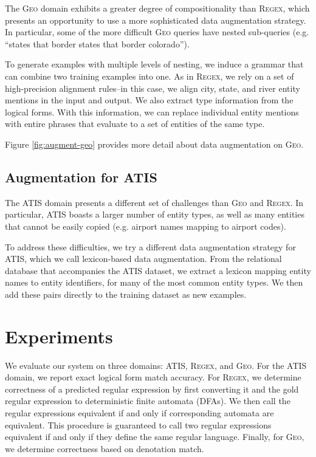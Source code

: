 \documentclass[11pt,letterpaper]{article}
\newcommand{\atis}{\textsc{ATIS}\xspace}
\newcommand{\regex}{\textsc{Regex}\xspace}
\newcommand{\geo}{\textsc{Geo}\xspace}
\begin{document}
The \geo domain exhibits a greater degree of compositionality
than \regex, which presents an opportunity to use a more sophisticated
data augmentation strategy.
In particular, some of the more difficult \geo queries have
nested sub-queries (e.g. ``states that border states that border colorado'').

To generate examples with multiple levels of nesting,
we induce a grammar that can combine two training examples into one.
As in \regex, we rely on a set of high-precision alignment rules--in this case,
we align city, state, and river entity mentions in the input and output.
We also extract type information from the logical forms.
With this information, we can replace individual entity mentions
with entire phrases that evaluate to a set of entities of the same type.

Figure \ref{fig:augment-geo}
provides more detail about data augmentation on \geo.

\subsection{Augmentation for \atis}
The \atis domain presents a different set of challenges than
\geo and \regex.  In particular, \atis boasts a larger number of
entity types, as well as many entities that cannot be easily copied
(e.g. airport names mapping to airport codes).

To address these difficulties, we try a different data augmentation
strategy for \atis, which we call lexicon-based data augmentation.
From the relational database that accompanies the \atis dataset,
we extract a lexicon mapping entity names to entity identifiers,
for many of the most common entity types.
We then add these pairs directly to the training dataset as new
examples.

\section{Experiments}
We evaluate our system on three domains: \atis, \regex, and \geo.
For the \atis domain, we report exact logical form match accuracy.
For \regex, we determine correctness of a predicted regular expression
by first converting it and the gold regular expression to
deterministic finite automata (DFAs).  We then call the regular expressions
equivalent if and only if corresponding automata are equivalent.
This procedure is guaranteed to call two regular expressions equivalent
if and only if they define the same regular language.
Finally, for \geo, we determine correctness based on denotation match.
\end{document}
